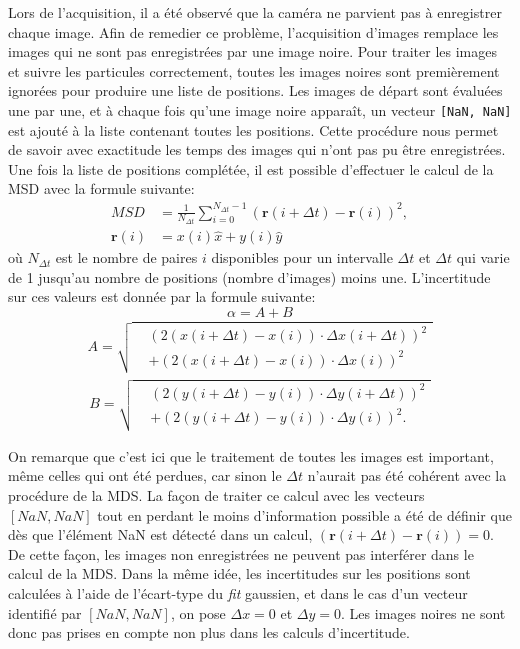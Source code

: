 \documentclass[11pt,letterpaper]{article}
\begin{document}
Lors de l'acquisition, il a été observé que la caméra ne parvient
pas à enregistrer chaque image. Afin de remedier ce problème, l'acquisition d'images remplace les images qui ne sont pas enregistrées par une image noire. 
Pour traiter les images et suivre les particules correctement, toutes les images noires sont premièrement ignorées pour 
produire une liste de positions. Les images de départ sont évaluées une par une, et à chaque fois qu'une
image noire apparaît, un vecteur \texttt{[NaN, NaN]} est ajouté à la liste contenant toutes les positions.
Cette procédure nous permet de savoir avec exactitude les temps des images qui n'ont pas pu être enregistrées. Une fois la liste de positions 
complétée, il est possible d'effectuer le calcul de la MSD avec la formule suivante: 
 \begin{align}
  MSD &= \frac{1}{N_{\Delta t}} \sum_{i=0}^{N_{\Delta t} - 1} \left( \mathbf{r}(i+\Delta t) - \mathbf{r}(i) \right)^2,\\ 
  \mathbf{r}(i) &= x(i)\hat{x}+ y(i)\hat{y}
\end{align}
où $N_{\Delta t}$ est le nombre de paires $i$ disponibles pour un intervalle $\Delta t$ et $\Delta t$ qui varie de 1 jusqu'au nombre de positions (nombre d'images) moins une. 
L'incertitude sur ces valeurs est donnée par la formule suivante: 
\begin{equation}
  \alpha =A+B
\end{equation}
\begin{align*}
  A = \sqrt{
    \begin{aligned}
      &\left( 2(x(i+\Delta t) - x(i))\cdot \Delta x(i+\Delta t) \right)^2 \\
      &+ \left( 2(x(i+\Delta t) - x(i))\cdot \Delta x(i) \right)^2
    \end{aligned}
  }
\end{align*}
\begin{align*}
  B = \sqrt{
    \begin{aligned}
      &\left( 2(y(i+\Delta t) - y(i))\cdot \Delta y(i+\Delta t) \right)^2 \\
      &+ \left( 2(y(i+\Delta t) - y(i))\cdot \Delta y(i) \right)^2.
    \end{aligned}
  }
\end{align*}

On remarque que c'est ici que le traitement de toutes les images est important, même celles qui ont été perdues, car sinon le $\Delta t$ n'aurait pas été cohérent avec la procédure de la MDS. 
La façon de traiter ce calcul avec les vecteurs $\left [ NaN ,NaN \right ]$ tout en perdant le moins d'information possible a été de définir que 
dès que l’élément NaN est détecté dans un calcul, $\left( \mathbf{r}(i+\Delta t) - \mathbf{r}(i) \right)=0$. De cette façon, les images non enregistrées
ne peuvent pas interférer dans le calcul de la MDS. Dans la même idée, les incertitudes sur les positions sont calculées à l'aide de l'écart-type 
du \textit{fit} gaussien, et dans le cas d'un vecteur identifié par $[NaN, NaN]$, on pose $\Delta x=0$ et $\Delta y=0$. Les images noires ne sont donc pas prises en compte non plus dans les calculs d'incertitude. 
\end{document}

